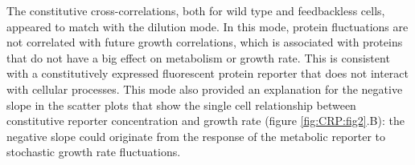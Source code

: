 %
%
The constitutive cross-correlations, both for wild type and feedbackless cells, appeared to match with the dilution mode.
In this mode, protein fluctuations are not correlated with future growth correlations, 
%
which is associated with proteins that do not have a big effect on metabolism or growth rate.
This is consistent with a constitutively expressed fluorescent protein reporter that does not interact with cellular processes.
%
This mode also provided an explanation for the negative slope in the scatter plots that show the single cell relationship 
between constitutive reporter concentration 
and growth rate (figure \ref{fig:CRP:fig2}.B): 
the negative slope could originate from the response of the metabolic reporter to stochastic growth rate fluctuations.




